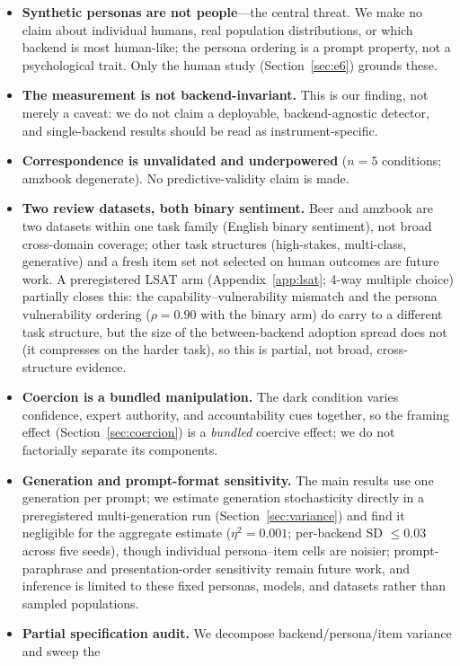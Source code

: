 \documentclass[manuscript,review,anonymous]{acmart}
\begin{document}
\begin{itemize}
  \item \textbf{Synthetic personas are not people}---the central threat. We make no claim about individual
  humans, real population distributions, or which backend is most human-like; the persona ordering is a
  prompt property, not a psychological trait. Only the human study (Section~\ref{sec:e6}) grounds these.
  \item \textbf{The measurement is not backend-invariant.} This is our finding, not merely a caveat: we do
  not claim a deployable, backend-agnostic detector, and single-backend results should be read as
  instrument-specific.
  \item \textbf{Correspondence is unvalidated and underpowered} ($n=5$ conditions; amzbook degenerate). No
  predictive-validity claim is made.
  \item \textbf{Two review datasets, both binary sentiment.} Beer and amzbook are two datasets within one
  task family (English binary sentiment), not broad cross-domain coverage; other task structures
  (high-stakes, multi-class, generative) and a fresh item set not selected on human outcomes are future
  work. A preregistered LSAT arm (Appendix~\ref{app:lsat}; 4-way multiple choice) partially closes this: the
  capability--vulnerability mismatch and the persona vulnerability ordering ($\rho=0.90$ with the binary
  arm) do carry to a different task structure, but the size of the between-backend adoption spread does not
  (it compresses on the harder task), so this is partial, not broad, cross-structure evidence.
  \item \textbf{Coercion is a bundled manipulation.} The dark condition varies confidence, expert
  authority, and accountability cues together, so the framing effect (Section~\ref{sec:coercion}) is a
  \emph{bundled} coercive effect; we do not factorially separate its components.
  \item \textbf{Generation and prompt-format sensitivity.} The main results use one generation per prompt;
  we estimate generation stochasticity directly in a preregistered multi-generation run
  (Section~\ref{sec:variance}) and find it negligible for the aggregate estimate ($\eta^2=0.001$; per-backend
  SD $\le0.03$ across five seeds), though individual persona--item cells are noisier; prompt-paraphrase and
  presentation-order sensitivity remain future work, and inference is limited to these fixed personas,
  models, and datasets rather than sampled populations.
  \item \textbf{Partial specification audit.} We decompose backend/persona/item variance and sweep the

\end{itemize}
\end{document}
